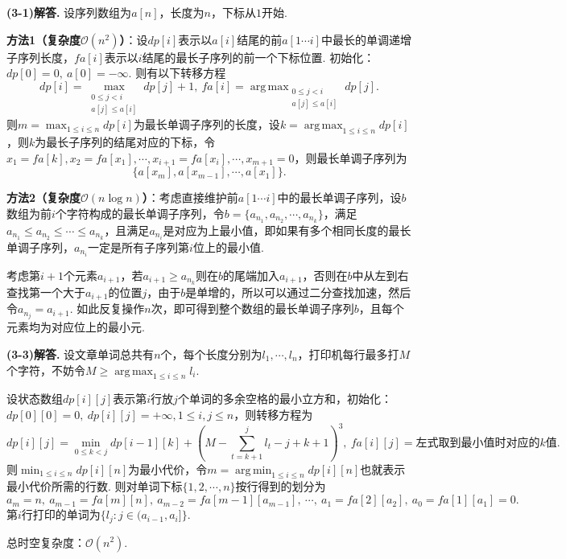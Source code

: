 \documentclass[12pt, a4paper, oneside]{ctexart}
\newenvironment{solution}[1]{\par\noindent\textbf{#1解答. }}{\smallskip\par}
\DeclareMathOperator*{\argmax}{arg\,max}  %
\DeclareMathOperator*{\argmin}{arg\,min}  %
\let\leq=\leqslant %
\let\geq=\geqslant %
\def\O{\mathcal{O}}         %
\def\add{\vspace{1ex}}      %
\begin{document}
\begin{solution}{(3-1)}
    设序列数组为$a[n]$，长度为$n$，下标从$1$开始.

    \textbf{方法1（复杂度$\O(n^2)$）}：设$dp[i]$表示以$a[i]$结尾的前$a[1\cdots i]$中最长的单调递增子序列长度，$fa[i]$表示以$i$结尾的最长子序列的前一个下标位置. 初始化：$dp[0] = 0,\ a[0]=-\infty$. 则有以下转移方程
    \begin{equation*}
        dp[i] = \max_{\substack{0\leq j < i\\ a[j]\leq a[i]}}dp[j]+1,\ fa[i] = \argmax_{\substack{0\leq j < i\\ a[j] \leq a[i]}}dp[j].
    \end{equation*}
    则$m=\max_{1\leq i\leq n}dp[i]$为最长单调子序列的长度，设$k = \argmax_{1\leq i\leq n}dp[i]$，则$k$为最长子序列的结尾对应的下标，令$x_1 = fa[k], x_2 = fa[x_1], \cdots, x_{i+1} = fa[x_i],\cdots, x_{m+1} = 0$，则最长单调子序列为
    \begin{equation*}
        \{a[x_m], a[x_{m-1}], \cdots, a[x_1]\}.
    \end{equation*}

    \textbf{方法2（复杂度$\O(n\log n)$）}：考虑直接维护前$a[1\cdots i]$中的最长单调子序列，设$b$数组为前$i$个字符构成的最长单调子序列，令$b=\{a_{n_1},a_{n_2},\cdots,a_{n_k}\}$，满足$a_{n_1}\leq a_{n_2}\leq \cdots\leq a_{n_k}$，且满足$a_{n_i}$是对应为上最小值，即如果有多个相同长度的最长单调子序列，$a_{n_i}$一定是所有子序列第$i$位上的最小值.
    
    考虑第$i+1$个元素$a_{i+1}$，若$a_{i+1}\geq a_{n_k}$则在$b$的尾端加入$a_{i+1}$，否则在$b$中从左到右查找第一个大于$a_{i+1}$的位置$j$，由于$b$是单增的，所以可以通过二分查找加速，然后令$a_{n_j} = a_{i+1}$. 如此反复操作$n$次，即可得到整个数组的最长单调子序列$b$，且每个元素均为对应位上的最小元.
\end{solution}
\begin{solution}{(3-3)}
    设文章单词总共有$n$个，每个长度分别为$l_1,\cdots, l_n$，打印机每行最多打$M$个字符，不妨令$M\geq \argmax_{1\leq i\leq n}l_i$.\add
    
    设状态数组$dp[i][j]$表示第$i$行放$j$个单词的多余空格的最小立方和，初始化：$dp[0][0] = 0,\ dp[i][j] = +\infty, 1\leq i,j \leq n$，则转移方程为
    \begin{equation*}
        dp[i][j] = \min_{0\leq k < j}dp[i-1][k]+\left(M-\sum_{t=k+1}^jl_t-j+k+1\right)^3,\ fa[i][j] = \text{左式取到最小值时对应的}k\text{值}.
    \end{equation*}
    则$\min_{1\leq i\leq n}dp[i][n]$为最小代价，令$m = \argmin_{1\leq i\leq n}dp[i][n]$也就表示最小代价所需的行数. 则对单词下标$\{1,2,\cdots,n\}$按行得到的划分为
    \begin{equation*}
        a_m = n,\ a_{m-1} = fa[m][n],\ a_{m-2} = fa[m-1][a_{m-1}],\ \cdots,\ a_1=fa[2][a_2],\ a_0 = fa[1][a_1]=0.
    \end{equation*}
    第$i$行打印的单词为$\{l_j:j\in (a_{i-1}, a_i]\}$.
    
    总时空复杂度：$\O(n^2)$.
\end{solution}
\end{document}

